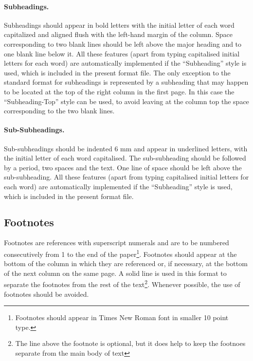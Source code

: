 \documentclass{stabs2021}
\begin{document}
\paragraph{Subheadings.}

Subheadings should appear in bold letters with the initial letter of
each word capitalized and aligned flush with the left-hand margin of
the column. Space corresponding to two blank lines should be left
above the major heading and to one blank line below it. All these
features (apart from typing capitalised initial letters for each word)
are automatically implemented if the ``Subheading'' style is used,
which is included in the present format file. The only exception to
the standard format for subheadings is represented by a subheading
that may happen to be located at the top of the right column in the
first page. In this case the ``Subheading-Top'' style can be used, to
avoid leaving at the column top the space corresponding to the two
blank lines.

\paragraph{Sub-Subheadings.}

Sub-subheadings should be indented 6 mm and appear in underlined
letters, with the initial letter of each word capitalised. The
sub-subheading should be followed by a period, two spaces and the
text. One line of space should be left above the sub-subheading. All
these features (apart from typing capitalised initial letters for
each word) are automatically implemented if the ``Subheading'' style
is used, which is included in the present format file.

\subsection{Footnotes}

Footnotes are references with superscript numerals and are to be
numbered consecutively from 1 to the end of the
paper\footnote{Footnotes should appear in Times New Roman font in
  smaller 10 point type.}. Footnotes should appear at the bottom of
the column in which they are referenced or, if necessary, at the
bottom of the next column on the same page. A solid line is used in
this format to separate the footnotes from the rest of the
text\footnote{The line above the footnote is optional, but it does
  help to keep the footnoes separate from the main body of
  text}. Whenever possible, the use of footnotes should be avoided.
\end{document}
